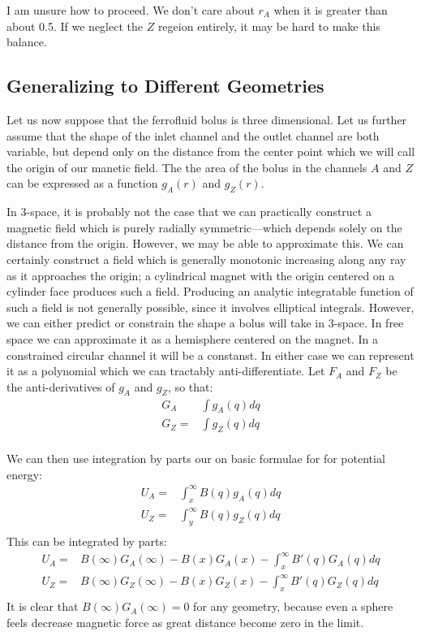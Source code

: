 \documentclass{asme2ej}
\begin{document}
I am unsure how to proceed. We don't care about $r_A$ when it is greater than about 0.5. If we neglect
the $Z$ regeion entirely, it may be hard to make this balance.


\subsection{Generalizing to Different Geometries}

Let us now suppose that the ferrofluid bolus is three dimensional.
Let us further assume that the shape of the inlet channel and
the outlet channel are both variable, but depend only on the distance
from the center point which we will call the origin of our manetic
field.
The the area of the bolus in the channels $A$ and $Z$ can be expressed
as a function $g_A(r)$ and $g_Z(r)$.

In 3-space, it is probably not the case that we can practically construct a
magnetic field which is purely radially symmetric---which depends solely on
the distance from the origin. However, we may be able to
approximate this. We can certainly construct a field which is
generally monotonic increasing along any ray as it approaches the origin;
a cylindrical magnet with the origin centered on a cylinder face produces
such a field. Producing an analytic integratable function of such
a field is not generally possible, since it involves elliptical integrals.
However, we can either predict or constrain the shape a bolus will take
in 3-space. In free space we can approximate it as a hemisphere centered
on the magnet. In a constrained circular channel it will be a constanst.
In either case we can represent it as a polynomial which we can
tractably anti-differentiate. Let $F_A$ and $F_Z$ be the anti-derivatives
of $g_A$ and $g_Z$, so that:
\begin{align}
  G_A &\int g_A(q) dq \\
  G_Z = & \int g_Z(q) dq \\
\end{align}

We can then use integration by parts our on basic formulae for
for potential energy:
\begin{align}
  U_A = &\int_x^\infty B(q) g_A(q) dq \\
  U_Z = & \int_y^\infty B(q) g_Z(q) dq \\
\end{align}
This can be integrated by parts:
\begin{align}
  U_A = & B(\infty) G_A(\infty) - B(x) G_A(x) - \int_x^\infty B'(q) G_A(q) dq \\
  U_Z = & B(\infty) G_Z(\infty) - B(x) G_Z(x) - \int_x^\infty B'(q) G_Z(q) dq \\
\end{align}
It is clear that $B(\infty) G_A(\infty) = 0$ for any geometry, because even a
sphere feels decrease magnetic force as great distance become zero in the limit.
\end{document}
